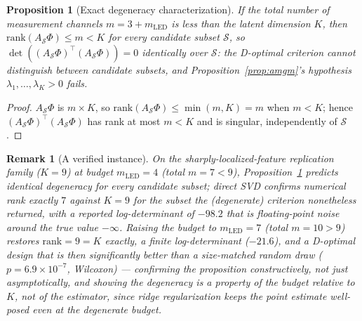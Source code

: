 \documentclass[11pt]{article}
\newtheorem{Proposition}{Proposition}
\newtheorem{Remark}{Remark}
\begin{document}
\begin{Proposition}[Exact degeneracy characterization]
\label{prop:rank-deficient}
If the total number of measurement channels $m=3+m_{\mathrm{LED}}$ is less than the latent dimension $K$, then $\mathrm{rank}(A_\mathcal{S}\Phi)\le m<K$ for every candidate subset $\mathcal{S}$, so $\det((A_\mathcal{S}\Phi)^\top(A_\mathcal{S}\Phi))=0$ identically over $\mathcal{S}$: the D-optimal criterion cannot distinguish between candidate subsets, and Proposition~\ref{prop:amgm}'s hypothesis $\lambda_1,\ldots,\lambda_K>0$ fails.
\end{Proposition}
\begin{proof}
$A_\mathcal{S}\Phi$ is $m\times K$, so $\mathrm{rank}(A_\mathcal{S}\Phi)\le\min(m,K)=m$ when $m<K$; hence $(A_\mathcal{S}\Phi)^\top(A_\mathcal{S}\Phi)$ has rank at most $m<K$ and is singular, independently of $\mathcal{S}$.
\end{proof}

\begin{Remark}[A verified instance]
\label{rmk:artist-paint-degenerate}
On the sharply-localized-feature replication family ($K=9$) at budget $m_{\mathrm{LED}}=4$ (total $m=7<9$), Proposition~\ref{prop:rank-deficient} predicts identical degeneracy for every candidate subset; direct SVD confirms numerical rank exactly $7$ against $K=9$ for the subset the (degenerate) criterion nonetheless returned, with a reported log-determinant of $-98.2$ that is floating-point noise around the true value $-\infty$. Raising the budget to $m_{\mathrm{LED}}=7$ (total $m=10>9$) restores $\mathrm{rank}=9=K$ exactly, a finite log-determinant ($-21.6$), and a D-optimal design that is then significantly better than a size-matched random draw ($p=6.9\times10^{-7}$, Wilcoxon) --- confirming the proposition constructively, not just asymptotically, and showing the degeneracy is a property of the budget relative to $K$, not of the estimator, since ridge regularization keeps the point estimate well-posed even at the degenerate budget.
\end{Remark}
\end{document}
